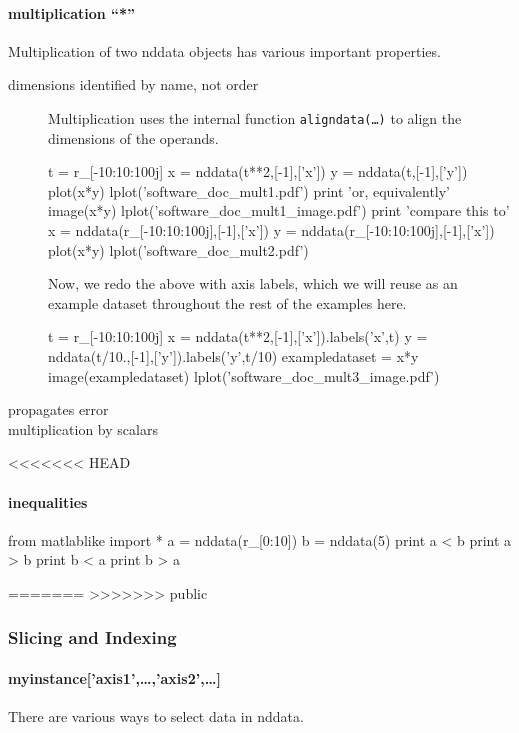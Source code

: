 \paragraph{multiplication ``*''}
Multiplication of two nddata objects has various important properties.
\begin{description}
\item[dimensions identified by name, not order]
Multiplication uses the internal function \texttt{aligndata(\ldots)} \label{codelabel:aligndata}
    to align the dimensions of the operands.

\begin{python}
t = r_[-10:10:100j]
x = nddata(t**2,[-1],['x'])
y = nddata(t,[-1],['y'])
plot(x*y)
lplot('software_doc_mult1.pdf')
print 'or, equivalently'
image(x*y)
lplot('software_doc_mult1_image.pdf')
print 'compare this to'
x = nddata(r_[-10:10:100j],[-1],['x'])
y = nddata(r_[-10:10:100j],[-1],['x'])
plot(x*y)
lplot('software_doc_mult2.pdf')
\end{python}

Now, we redo the above with axis labels,
    which we will reuse as an example dataset
    throughout the rest of the examples here.

\begin{python}
t = r_[-10:10:100j]
x = nddata(t**2,[-1],['x']).labels('x',t)
y = nddata(t/10.,[-1],['y']).labels('y',t/10)
exampledataset = x*y
image(exampledataset)
lplot('software_doc_mult3_image.pdf')
\end{python}
\item[propagates error]
\nts{\ldots}
\item[multiplication by scalars]
\nts{\ldots}
\end{description}
<<<<<<< HEAD
\paragraph{inequalities}

\begin{python}
from matlablike import *
a = nddata(r_[0:10])
b = nddata(5)
print a < b
print a > b
print b < a
print b > a
\end{python}
=======
>>>>>>> public
\subsubsection{Slicing and Indexing}
\paragraph{myinstance['axis1',\ldots,'axis2',\ldots]}
There are various ways to select data in nddata.

